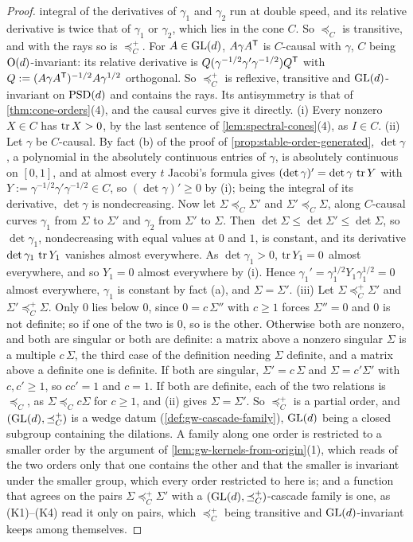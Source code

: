 \begin{proof}
integral of the derivatives of $\gamma_1$ and $\gamma_2$ run at double speed, and its relative derivative is twice that of
$\gamma_1$ or $\gamma_2$, which lies in the cone $C$. So $\preceq_C$ is transitive, and with the rays so is
$\preceq^+_C$. For $A \in \mathrm{GL}(d)$, $A\gamma A^{\mathsf{T}}$ is $C$-causal with $\gamma$, $C$ being $\mathrm{O}(d)$-invariant: its
relative derivative is
$Q(\gamma^{-1/2}\gamma'\gamma^{-1/2})Q^{\mathsf{T}}$ with $Q := (A\gamma A^{\mathsf{T}})^{-1/2}A\gamma^{1/2}$ orthogonal. So
$\preceq^+_C$ is reflexive, transitive and $\mathrm{GL}(d)$-invariant on $\mathrm{PSD}(d)$ and contains the rays.
Its antisymmetry is that of \ref{thm:cone-orders}(4), and the causal curves give it directly.
(i) Every nonzero $X \in C$ has $\operatorname{tr} X > 0$, by the last sentence of \ref{lem:spectral-cones}(4), as
$I \in C$. (ii) Let $\gamma$ be $C$-causal. By fact (b) of the proof of
\ref{prop:stable-order-generated}, $\det\gamma$, a polynomial in the absolutely continuous entries of
$\gamma$, is absolutely continuous on $[0,1]$, and at almost every $t$ Jacobi's formula gives
$(\det\gamma)' = \det\gamma\,\operatorname{tr} Y$ with $Y := \gamma^{-1/2}\gamma'\gamma^{-1/2} \in C$, so $(\det\gamma)' \ge 0$
by (i); being the integral of its derivative, $\det\gamma$ is nondecreasing. Now let $\Sigma \preceq_C \Sigma'$
and $\Sigma' \preceq_C \Sigma$, along $C$-causal curves $\gamma_1$ from $\Sigma$ to $\Sigma'$ and $\gamma_2$ from
$\Sigma'$ to $\Sigma$. Then $\det\Sigma \le \det\Sigma' \le \det\Sigma$, so $\det\gamma_1$, nondecreasing with
equal values at $0$ and $1$, is constant, and its derivative $\det\gamma_1\,\operatorname{tr} Y_1$ vanishes almost
everywhere. As $\det\gamma_1 > 0$, $\operatorname{tr} Y_1 = 0$ almost everywhere, and so $Y_1 = 0$ almost everywhere by (i).
Hence $\gamma_1' = \gamma_1^{1/2}Y_1\gamma_1^{1/2} = 0$ almost everywhere, $\gamma_1$ is constant by fact (a),
and $\Sigma = \Sigma'$. (iii) Let $\Sigma \preceq^+_C \Sigma'$ and $\Sigma' \preceq^+_C \Sigma$. Only $0$ lies
below $0$, since $0 = c\,\Sigma''$ with $c \ge 1$ forces $\Sigma'' = 0$ and $0$ is not definite; so if one of
the two is $0$, so is the other. Otherwise both are nonzero, and both are singular or both are definite:
a matrix above a nonzero singular $\Sigma$ is a multiple $c\,\Sigma$, the third case of the definition
needing $\Sigma$ definite, and a matrix above a definite one is definite. If both are singular,
$\Sigma' = c\,\Sigma$ and $\Sigma = c'\Sigma'$ with $c, c' \ge 1$, so $cc' = 1$ and $c = 1$. If both are
definite, each of the two relations is $\preceq_C$, as $\Sigma \preceq_C c\Sigma$ for $c \ge 1$, and (ii) gives
$\Sigma = \Sigma'$. So $\preceq^+_C$ is a partial order, and $(\mathrm{GL}(d), \preceq^+_C)$ is a wedge datum
(\ref{def:gw-cascade-family}), $\mathrm{GL}(d)$ being a closed subgroup containing the dilations. A family along one
order is restricted to a smaller order by the argument of \ref{lem:gw-kernels-from-origin}(1), which reads
of the two orders only that one contains the other and that the smaller is invariant under the smaller
group, which every order restricted to here is; and a function that agrees on the pairs
$\Sigma \preceq^+_C \Sigma'$ with a $(\mathrm{GL}(d), \preceq^+_C)$-cascade family is one, as (K1)--(K4) read it only
on pairs, which $\preceq^+_C$ being transitive and $\mathrm{GL}(d)$-invariant keeps among themselves.


\end{proof}
